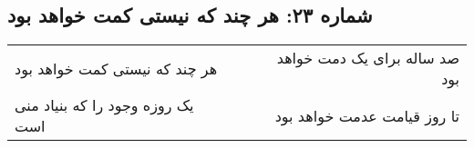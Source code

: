 \begin{center}
\section*{شماره ۲۳: هر چند که نیستی کمت خواهد بود}
\label{sec:023}
\begin{longtable}{l p{0.5cm} r}
هر چند که نیستی کمت خواهد بود
&&
صد ساله برای یک دمت خواهد بود
\\
یک روزه وجود را که بنیاد منی است
&&
تا روز قیامت عدمت خواهد بود
\\
\end{longtable}
\end{center}
